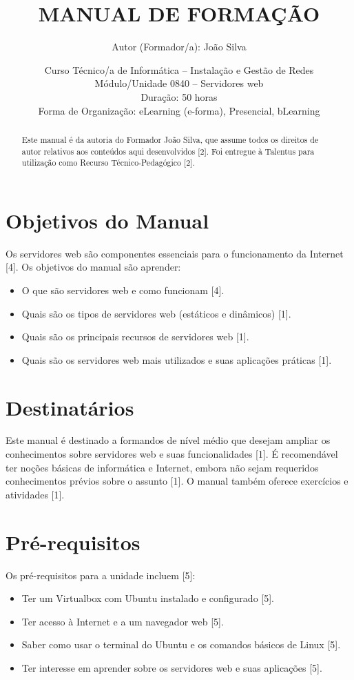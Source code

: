 \documentclass[12pt, a4paper]{article}
\title{\textbf{MANUAL DE FORMAÇÃO}}
\author{Autor (Formador/a): João Silva} %
\date{Curso Técnico/a de Informática – Instalação e Gestão de Redes \\ 
	Módulo/Unidade 0840 – Servidores web \\
	Duração: 50 horas \\
	Forma de Organização: eLearning (e-forma), Presencial, bLearning} %
\begin{document}
	\maketitle
	
	\thispagestyle{empty} %
	
	\begin{abstract}
		Este manual é da autoria do Formador João Silva, que assume todos os direitos de autor relativos aos conteúdos aqui desenvolvidos [2]. Foi entregue à Talentus para utilização como Recurso Técnico-Pedagógico [2].
	\end{abstract}
	
	\newpage
	\tableofcontents %
	
	\newpage
	
	\section*{Objetivos do Manual}
	Os servidores web são componentes essenciais para o funcionamento da Internet [4]. Os objetivos do manual são aprender:
	\begin{itemize}
		\item O que são servidores web e como funcionam [4].
		\item Quais são os tipos de servidores web (estáticos e dinâmicos) [1].
		\item Quais são os principais recursos de servidores web [1].
		\item Quais são os servidores web mais utilizados e suas aplicações práticas [1].
	\end{itemize}
	
	\section*{Destinatários}
	Este manual é destinado a formandos de nível médio que desejam ampliar os conhecimentos sobre servidores web e suas funcionalidades [1]. É recomendável ter noções básicas de informática e Internet, embora não sejam requeridos conhecimentos prévios sobre o assunto [1]. O manual também oferece exercícios e atividades [1].
	
	\section*{Pré-requisitos}
	Os pré-requisitos para a unidade incluem [5]:
	\begin{itemize}
		\item Ter um Virtualbox com Ubuntu instalado e configurado [5].
		\item Ter acesso à Internet e a um navegador web [5].
		\item Saber como usar o terminal do Ubuntu e os comandos básicos de Linux [5].
		\item Ter interesse em aprender sobre os servidores web e suas aplicações [5].
	\end{itemize}
	
\end{document}
